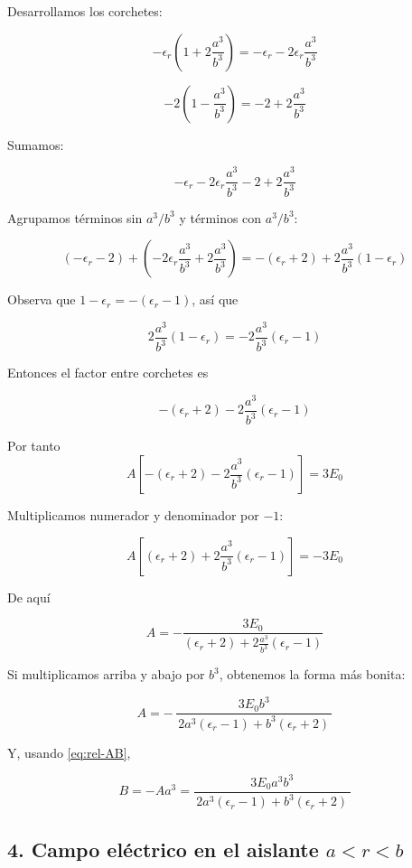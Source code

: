 \documentclass{article}
\begin{document}
Desarrollamos los corchetes:

\[
-\epsilon_{r}\left(1 + 2\frac{a^{3}}{b^{3}}\right)
= -\epsilon_{r} - 2\epsilon_{r}\frac{a^{3}}{b^{3}}
\]

\[
-2\left(1 - \frac{a^{3}}{b^{3}}\right)
= -2 + 2\frac{a^{3}}{b^{3}}
\]

Sumamos:

\[
-\epsilon_{r} - 2\epsilon_{r}\frac{a^{3}}{b^{3}} - 2 + 2\frac{a^{3}}{b^{3}}
\]

Agrupamos términos sin $a^{3}/b^{3}$ y términos con $a^{3}/b^{3}$:

\[
(-\epsilon_{r} - 2) 
+ \left(- 2\epsilon_{r}\frac{a^{3}}{b^{3}} + 2\frac{a^{3}}{b^{3}}\right)
=
-(\epsilon_{r}+2) + 2\frac{a^{3}}{b^{3}}(1-\epsilon_{r})
\]

Observa que $1-\epsilon_{r} = -(\epsilon_{r}-1)$, así que

\[
2\frac{a^{3}}{b^{3}}(1-\epsilon_{r})
= -2\frac{a^{3}}{b^{3}}(\epsilon_{r}-1)
\]

Entonces el factor entre corchetes es

\[
-(\epsilon_{r}+2) - 2\frac{a^{3}}{b^{3}}(\epsilon_{r}-1)
\]

Por tanto
\[
A\left[-(\epsilon_{r}+2) - 2\frac{a^{3}}{b^{3}}(\epsilon_{r}-1)\right]
= 3E_{0}
\]

Multiplicamos numerador y denominador por $-1$:

\[
A\left[(\epsilon_{r}+2) + 2\frac{a^{3}}{b^{3}}(\epsilon_{r}-1)\right]
= -3E_{0}
\]

De aquí

\begin{equation}
A =
-\frac{3E_{0}}
{(\epsilon_{r}+2) + 2\frac{a^{3}}{b^{3}}(\epsilon_{r}-1)}
\label{eq:A-previa}
\end{equation}

Si multiplicamos arriba y abajo por $b^{3}$, obtenemos la forma más bonita:

\begin{equation}
A = -\,\frac{3E_{0} b^{3}}
{\,2a^{3}(\epsilon_{r}-1) + b^{3}(\epsilon_{r}+2)\,}
\label{eq:A-final}
\end{equation}

Y, usando \eqref{eq:rel-AB},

\begin{equation}
B = -A a^{3}
= \frac{3E_{0} a^{3} b^{3}}
{\,2a^{3}(\epsilon_{r}-1) + b^{3}(\epsilon_{r}+2)\,}
\label{eq:B-final}
\end{equation}

\subsection*{4. Campo eléctrico en el aislante $a<r<b$}
\end{document}
